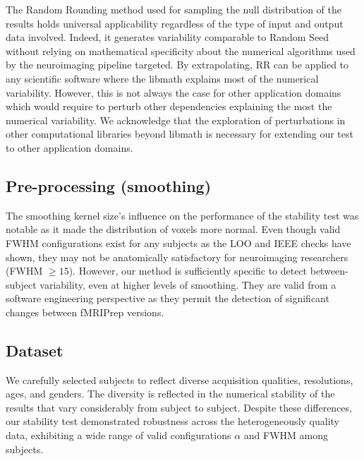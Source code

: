 \documentclass[lettersize,journal]{IEEEtran}
\newcommand{\fmriprep}{fMRIPrep\xspace}
\begin{document}
The Random Rounding method used for sampling the null distribution of the results holds universal applicability regardless of the type of input and output data involved. Indeed, it generates variability comparable to Random Seed without relying on mathematical specificity about the numerical algorithms used by the neuroimaging pipeline targeted. By extrapolating, RR can be applied to any scientific software where the libmath explains most of the numerical variability. However, this is not always the case for other application domains~\cite{pepe2022numerical} which would require to perturb other dependencies explaining the most the numerical variability. We acknowledge that the exploration of perturbations in other computational libraries beyond libmath is necessary for extending our test to other application domains.


\subsection*{Pre-processing (smoothing)}

The smoothing kernel size's influence on the performance of the stability test was notable as it made the distribution of voxels more normal.
Even though valid FWHM configurations exist for any subjects as the LOO and IEEE checks have shown, they may not be anatomically satisfactory for neuroimaging researchers (FWHM $\geq 15$). However, our method is sufficiently specific to detect between-subject variability, even at higher levels of smoothing. They are valid from a software engineering perspective as they permit the detection of significant changes between \fmriprep versions.

\subsection*{Dataset}

We carefully selected subjects to reflect diverse acquisition qualities, resolutions, ages, and genders.
The diversity is reflected in the numerical stability of the results that vary considerably from subject to subject.
Despite these differences, our stability test demonstrated robustness across the heterogeneously quality data, exhibiting a wide range of valid configurations $\alpha$ and FWHM among subjects.
\end{document}
